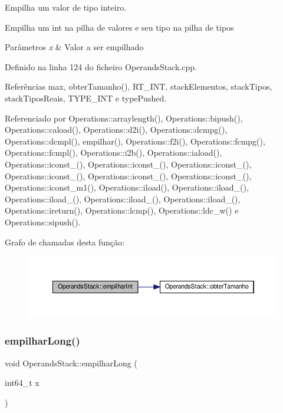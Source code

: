Empilha um valor de tipo inteiro. 

Empilha um int na pilha de valores e seu tipo na pilha de tipos


\begin{DoxyParams}{Parâmetros}
{\em x} & Valor a ser empilhado \\
\hline
\end{DoxyParams}


Definido na linha 124 do ficheiro Operands\+Stack.\+cpp.



Referências max, obter\+Tamanho(), R\+T\+\_\+\+I\+NT, stack\+Elementos, stack\+Tipos, stack\+Tipos\+Reais, T\+Y\+P\+E\+\_\+\+I\+NT e type\+Pushed.



Referenciado por Operations\+::arraylength(), Operations\+::bipush(), Operations\+::caload(), Operations\+::d2i(), Operations\+::dcmpg(), Operations\+::dcmpl(), empilhar(), Operations\+::f2i(), Operations\+::fcmpg(), Operations\+::fcmpl(), Operations\+::i2b(), Operations\+::iaload(), Operations\+::iconst\+\_(), Operations\+::iconst\+\_(), Operations\+::iconst\+\_(), Operations\+::iconst\+\_(), Operations\+::iconst\+\_(), Operations\+::iconst\+\_(), Operations\+::iconst\+\_\+m1(), Operations\+::iload(), Operations\+::iload\+\_(), Operations\+::iload\+\_(), Operations\+::iload\+\_(), Operations\+::iload\+\_(), Operations\+::ireturn(), Operations\+::lcmp(), Operations\+::ldc\+\_\+w() e Operations\+::sipush().

Grafo de chamadas desta função\+:\nopagebreak
\begin{figure}[H]
\begin{center}
\leavevmode
\includegraphics[width=350pt]{classOperandsStack_a5006a59c2d815e4a24b055e2e4d2e741_cgraph}
\end{center}
\end{figure}
\mbox{\label{classOperandsStack_a927ca84358d7e0f45f74d122f9a500d2}} 
\subsubsection{\texorpdfstring{empilhar\+Long()}{empilharLong()}}
{\footnotesize\ttfamily void Operands\+Stack\+::empilhar\+Long (\begin{DoxyParamCaption}\item[{int64\+\_\+t}]{x }\end{DoxyParamCaption})}



